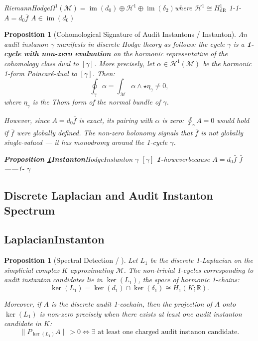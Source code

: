\documentclass[11pt,a4paper]{article}
\theoremstyle{plain}
\newtheorem{proposition}[theorem]{Proposition}
\theoremstyle{definition}
\DeclareMathOperator{\im}{im}
\newcommand{\R}{\mathbb{R}}
\newcommand{\cM}{\mathcal{M}}
\begin{document}
\bigskip
\noindent
\textit{RiemannHodge$\Omega^1(\cM) = \im(d_0) \oplus \mathcal{H}^1 \oplus \im(\delta_2)$where $\mathcal{H}^1 \cong H^1_{\text{dR}}$ 1-1- $A = d_0 \bar{f}$ $A \in \im(d_0)$}

\begin{proposition}[Cohomological Signature of Audit Instantons / Instanton]
\label{prop:hodge}
An audit instanon $\gamma$ manifests in discrete Hodge theory as follows:
the cycle $\gamma$ is a \textbf{1-cycle with non-zero evaluation} on the 
harmonic representative of the cohomology class dual to $[\gamma]$. More 
precisely, let $\alpha \in \mathcal{H}^1(\cM)$ be the harmonic 1-form 
Poincar\'{e}-dual to $[\gamma]$. Then:
\begin{equation}
  \oint_{\gamma} \alpha = \int_{\cM} \alpha \wedge \star \eta_{\gamma} \neq 0,
  \label{eq:poincare}
\end{equation}
where $\eta_{\gamma}$ is the Thom form of the normal bundle of $\gamma$.

However, since $A = d_0 \bar{f}$ is exact, its pairing with $\alpha$ is zero:
$\oint_{\gamma} A = 0$ would hold if $\bar{f}$ were globally defined. The 
non-zero holonomy signals that $\bar{f}$ is not globally single-valued — it 
has monodromy around the 1-cycle $\gamma$.
\end{proposition}

\bigskip
\noindent
\textit{\textbf{Proposition \ref{prop:hodge}Instanton}HodgeInstanton $\gamma$  $[\gamma]$ \textbf{1-}howeverbecause $A = d_0 \bar{f}$ $\bar{f}$ ——1- $\gamma$ }

\subsection{Discrete Laplacian and Audit Instanton Spectrum}
\subsection*{LaplacianInstanton}

\begin{proposition}[Spectral Detection / ]
\label{prop:spectral}
Let $L_1$ be the discrete 1-Laplacian on the simplicial complex $K$ 
approximating $\cM$. The non-trivial 1-cycles corresponding to audit 
instanton candidates lie in $\ker(L_1)$, the space of harmonic 1-chains:
\begin{equation}
  \ker(L_1) = \ker(d_1) \cap \ker(\delta_1) \cong H_1(K; \R).
  \label{eq:kerL1}
\end{equation}

Moreover, if $A$ is the discrete audit 1-cochain, then the projection of 
$A$ onto $\ker(L_1)$ is non-zero precisely when there exists at least one 
audit instanton candidate in $K$:
\begin{equation}
  \|P_{\ker(L_1)} A\| > 0 \iff \exists \text{ at least one charged audit instanon candidate}.
  \label{eq:proj}
\end{equation}
\end{proposition}
\end{document}
